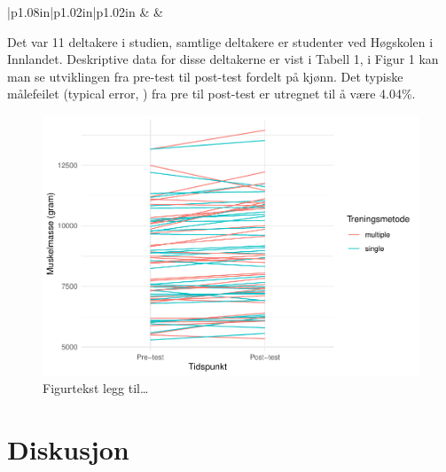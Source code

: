 \documentclass[
]{book}
\begin{document}
\begin{longtable}[c]{|p{1.08in}|p{1.02in}|p{1.02in}}
 &  &  \\

\noalign{\global\setlength{\arrayrulewidth}{2pt}}



\end{longtable}

Det var 11 deltakere i studien, samtlige deltakere er studenter ved Høgskolen i Innlandet. Deskriptive data for disse deltakerne er vist i Tabell 1, i Figur 1 kan man se utviklingen fra pre-test til post-test fordelt på kjønn. Det typiske målefeilet (typical error, \citep{hopkins2000}) fra pre til post-test er utregnet til å være 4.04\%.

\begin{figure}
\centering
\includegraphics{_main_files/figure-latex/Figur-1.pdf}
\caption{\label{fig:Figur}Figurtekst legg til\ldots{}}
\end{figure}

\hypertarget{diskusjon}{%
\section{Diskusjon}\label{diskusjon}}
\end{document}
